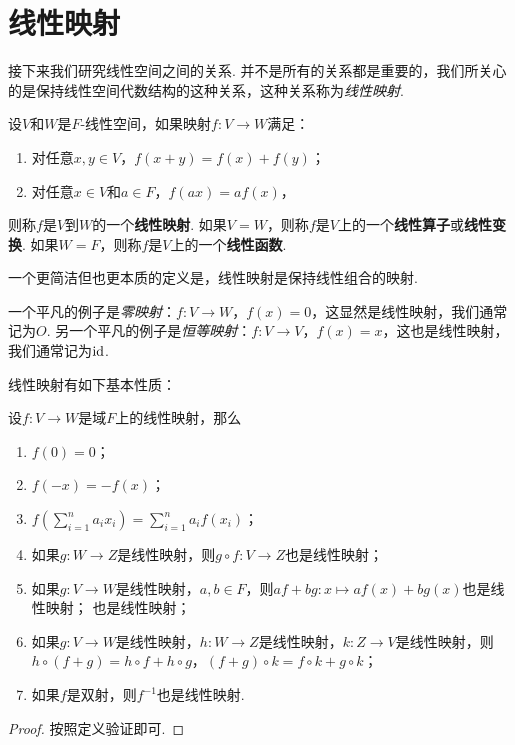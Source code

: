 \section{线性映射}

接下来我们研究线性空间之间的关系. 并不是所有的关系都是重要的，我们所关心的是保持线性空间代数结构的这种关系，这种关系称为\emph{线性映射}. 

\begin{definition}
设$V$和$W$是$F$-线性空间，如果映射$f:V\to W$满足：
\begin{enumerate}
    \item 对任意$x,y\in V$，$f(x+y)=f(x)+f(y)$；
    \item 对任意$x\in V$和$a\in F$，$f(ax)=af(x)$，
\end{enumerate}
则称$f$是$V$到$W$的一个\textbf{线性映射}. 如果$V=W$，则称$f$是$V$上的一个\textbf{线性算子}或\textbf{线性变换}. 如果$W=F$，则称$f$是$V$上的一个\textbf{线性函数}.
\end{definition}

一个更简洁但也更本质的定义是，线性映射是保持线性组合的映射. 

\begin{example}
一个平凡的例子是\emph{零映射}：$f:V\to W$，$f(x)=0$，这显然是线性映射，我们通常记为$O$. 另一个平凡的例子是\emph{恒等映射}：$f:V\to V$，$f(x)=x$，这也是线性映射，我们通常记为$\mathrm{id}$.
\end{example}

线性映射有如下基本性质：

\begin{proposition}\label{prop:linear-map-basic}
设$f:V\to W$是域$F$上的线性映射，那么
\begin{enumerate}
    \item $f(0)=0$；
    \item $f(-x)=-f(x)$；
    \item $f(\sum_{i=1}^n a_ix_i)=\sum_{i=1}^n a_if(x_i)$；
    \item 如果$g:W\to Z$是线性映射，则$g\circ f:V\to Z$也是线性映射；
    \item 如果$g:V\to W$是线性映射，$a,b\in F$，则$af+bg:x\mapsto af(x)+bg(x)$也是线性映射；
    也是线性映射；
    \item 如果$g:V\to W$是线性映射，$h:W\to Z$是线性映射，$k:Z\to V$是线性映射，则$h\circ(f+g)=h\circ f+h\circ g$，$(f+g)\circ k = f\circ k+g\circ k$；
    \item 如果$f$是双射，则$f^{-1}$也是线性映射. 
\end{enumerate}
\end{proposition}
\begin{proof}
    按照定义验证即可. 
\end{proof}

